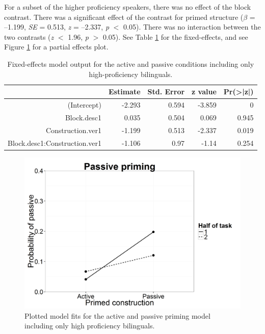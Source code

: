 For a subset of the higher proficiency speakers, there was no effect of the block contrast. There was a significant effect of the contrast for primed structure (\emph{$\beta$} = --1.199, \emph{SE} = 0.513, \emph{z} = --2.337, \emph{p} $<$ 0.05). There was no interaction between the two contrasts (\emph{z} $<$ 1.96, \emph{p} $>$ 0.05).  See Table \ref{tab:priming.fixef.ap.hp} for the fixed-effects, and see Figure \ref{fig:priming.fixef.ap.hp} for a partial effects plot.

\begin{table}[htbp]
  \centering
  \caption{Fixed-effects model output for the active and passive conditions including only high-proficiency bilinguals.}
    \begin{tabular}{rrrrr}
    \toprule
          & Estimate & Std. Error & z value & Pr(>|z|) \\
    \midrule
    (Intercept) & -2.293 & 0.594 & -3.859 & 0 \\
    Block.desc1 & 0.035 & 0.504 & 0.069 & 0.945 \\
    Construction.ver1 & -1.199 & 0.513 & -2.337 & 0.019 \\
    Block.desc1:Construction.ver1 & -1.106 & 0.97  & -1.14 & 0.254 \\
    \bottomrule
    \end{tabular}%
  \label{tab:priming.fixef.ap.hp}%
\end{table}%

\begin{figure}[htbp]
\centering
\includegraphics[width=\textwidth,height=\textheight,keepaspectratio]{ap_1.png}
\caption{Plotted model fits for the active and passive priming model including only high proficiency bilinguals.}
\label{fig:priming.fixef.ap.hp}
\end{figure}


